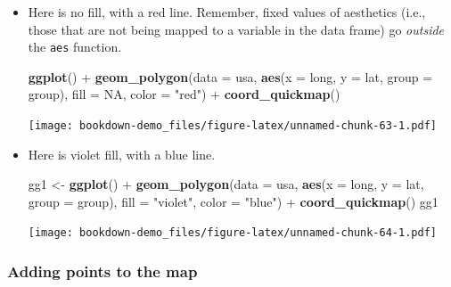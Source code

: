 \documentclass[]{book}
\newenvironment{Shaded}{\begin{snugshade}}{\end{snugshade}}
\newcommand{\KeywordTok}[1]{\textcolor[rgb]{0.13,0.29,0.53}{\textbf{{#1}}}}
\newcommand{\DataTypeTok}[1]{\textcolor[rgb]{0.13,0.29,0.53}{{#1}}}
\newcommand{\StringTok}[1]{\textcolor[rgb]{0.31,0.60,0.02}{{#1}}}
\newcommand{\OtherTok}[1]{\textcolor[rgb]{0.56,0.35,0.01}{{#1}}}
\newcommand{\NormalTok}[1]{{#1}}
\theoremstyle{definition}
\theoremstyle{definition}
\theoremstyle{remark}
\begin{document}
\begin{itemize}
\item
  Here is no fill, with a red line. Remember, fixed values of aesthetics
  (i.e., those that are not being mapped to a variable in the data
  frame) go \emph{outside} the \texttt{aes} function.

\begin{Shaded}
\begin{Highlighting}[]
\KeywordTok{ggplot}\NormalTok{() +}\StringTok{ }
\StringTok{  }\KeywordTok{geom_polygon}\NormalTok{(}\DataTypeTok{data =} \NormalTok{usa, }\KeywordTok{aes}\NormalTok{(}\DataTypeTok{x =} \NormalTok{long, }\DataTypeTok{y =} \NormalTok{lat, }\DataTypeTok{group =} \NormalTok{group), }\DataTypeTok{fill =} \OtherTok{NA}\NormalTok{, }\DataTypeTok{color =} \StringTok{"red"}\NormalTok{) +}\StringTok{ }
\StringTok{  }\KeywordTok{coord_quickmap}\NormalTok{()}
\end{Highlighting}
\end{Shaded}

  \texttt{[image: bookdown-demo\_files/figure-latex/unnamed-chunk-63-1.pdf]}
\item
  Here is violet fill, with a blue line.

\begin{Shaded}
\begin{Highlighting}[]
\NormalTok{gg1 <-}\StringTok{ }\KeywordTok{ggplot}\NormalTok{() +}\StringTok{ }
\StringTok{  }\KeywordTok{geom_polygon}\NormalTok{(}\DataTypeTok{data =} \NormalTok{usa, }\KeywordTok{aes}\NormalTok{(}\DataTypeTok{x =} \NormalTok{long, }\DataTypeTok{y =} \NormalTok{lat, }\DataTypeTok{group =} \NormalTok{group), }\DataTypeTok{fill =} \StringTok{"violet"}\NormalTok{, }\DataTypeTok{color =} \StringTok{"blue"}\NormalTok{) +}\StringTok{ }
\StringTok{  }\KeywordTok{coord_quickmap}\NormalTok{()}
\NormalTok{gg1}
\end{Highlighting}
\end{Shaded}

  \texttt{[image: bookdown-demo\_files/figure-latex/unnamed-chunk-64-1.pdf]}
\end{itemize}

\subsubsection{Adding points to the map}\label{adding-points-to-the-map}
\end{document}
